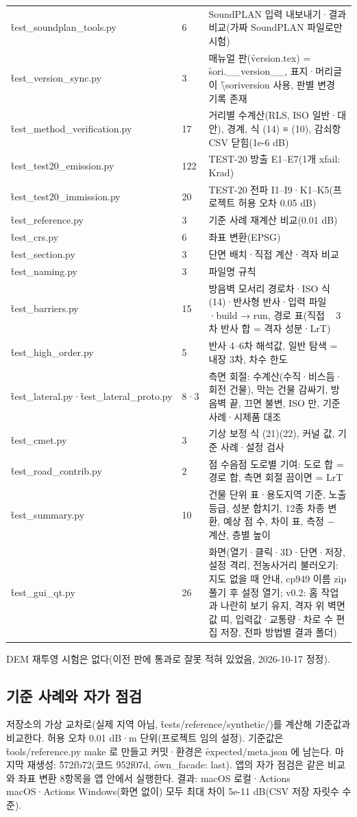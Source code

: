 \documentclass[10.5pt,a4paper]{article}
\begin{document}
\begin{longtable}{P{52mm}P{10mm}P{90mm}}
\f{test\_soundplan\_tools.py} & 6 & SoundPLAN 입력 내보내기·결과 비교(가짜 SoundPLAN 파일로만 시험) \\
\f{test\_version\_sync.py} & 3 & 매뉴얼 판(\f{version.tex}) = \f{sori.\_\_version\_\_}, 표지·머리글이 \f{\textbackslash soriversion} 사용, 판별 변경 기록 존재 \\
\f{test\_method\_verification.py} & 17 & 거리별 수계산(RLS, ISO 일반·대안), 경계, 식 (14) ≡ (10), 감쇠항 CSV 닫힘(1e-6 dB) \\
\f{test\_test20\_emission.py} & 122 & TEST-20 방출 E1–E7(1개 xfail: Krad) \\
\f{test\_test20\_immission.py} & 20 & TEST-20 전파 I1–I9·K1–K5(프로젝트 허용 오차 0.05 dB) \\
\f{test\_reference.py} & 3 & 기준 사례 재계산 비교(0.01 dB) \\
\f{test\_crs.py} & 6 & 좌표 변환(EPSG) \\
\f{test\_section.py} & 3 & 단면 배치·직접 계산·격자 비교 \\
\f{test\_naming.py} & 3 & 파일명 규칙 \\
\f{test\_barriers.py} & 15 & 방음벽 모서리 경로차·ISO 식 (14)·반사형 반사·입력 파일·build → run, 경로 표(직접 ~ 3차 반사 합 = 격자 성분·LrT) \\
\f{test\_high\_order.py} & 5 & 반사 4–6차 해석값, 일반 탐색 = 내장 3차, 차수 한도 \\
\f{test\_lateral.py}·\f{test\_lateral\_proto.py} & 8·3 & 측면 회절: 수계산(수직·비스듬·회전 건물), 막는 건물 감싸기, 방음벽 끝, 끄면 불변, ISO 만, 기준 사례·시제품 대조 \\
\f{test\_cmet.py} & 3 & 기상 보정 식 (21)(22), 커널 값, 기준 사례·설정 검사 \\
\f{test\_road\_contrib.py} & 2 & 점 수음점 도로별 기여: 도로 합 = 경로 합, 측면 회절 끔이면 = LrT \\
\f{test\_summary.py} & 10 & 건물 단위 표·용도지역 기준, 노출 등급, 성분 합치기, 12종 차종 변환, 예상 점 수, 차이 표, 측정 − 계산, 층별 높이 \\
\f{test\_gui\_qt.py} & 26 & 화면(열기·클릭·3D·단면·저장, 설정 격리, 전농사거리 불러오기: 지도 없을 때 안내, cp949 이름 zip 풀기 후 설정 열기; v0.2: 홈 작업과 나란히 보기 유지, 격자 위 벽면 값 띠, 입력값·교통량·차로 수 편집 저장, 전파 방법별 결과 폴더) \\
\bottomrule
\end{longtable}
DEM 재투영 시험은 없다(이전 판에 통과로 잘못 적혀 있었음, 2026-10-17 정정).

\subsection{기준 사례와 자가 점검}
저장소의 가상 교차로(실제 지역 아님, \f{tests/reference/synthetic/})를 계산해 기준값과 비교한다. 허용 오차 0.01 dB·m 단위(프로젝트 임의 설정). 기준값은 \f{tools/reference.py make} 로 만들고 커밋·환경은 \f{expected/meta.json} 에 남는다. 마지막 재생성: \f{572fb72}(코드 \f{952f07d}, \f{own\_facade: last}). 앱의 자가 점검은 같은 비교와 좌표 변환 8항목을 앱 안에서 실행한다. 결과: macOS 로컬·Actions macOS·Actions Windows(화면 없이) 모두 최대 차이 5e-11 dB(CSV 저장 자릿수 수준).
\end{document}
